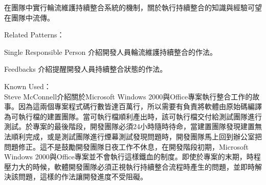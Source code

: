 \begin{description}
\begin{description}
\item 在團隊中實行輪流維護持續整合系統的機制，關於執行持續整合的知識與經驗可望在團隊中流傳。
\end{description} 
\item Related Patterns：
\begin{description}
\item Single Responsible Person 介紹開發人員輪流維護持續整合的作法。
\item Feedbacks 介紹提醒開發人員持續整合狀態的作法。
\end{description}
\item Known Used：\\
Steve McConnell介紹關於Microsoft Windows 2000與Office專案執行整合工作的故事\cite{codecomplete}。因為這兩個專案程式碼行數皆達百萬行，所以需要有負責將軟體由原始碼編譯為可執行檔的建置團隊。當可執行檔順利產出時，該可執行檔交付給測試團隊進行測試。於專案的最後階段，開發團隊必須24小時隨時待命，當建置團隊發現建置無法順利完成，或是測試團隊進行煙幕測試發現問題時，開發團隊馬上回到辦公室把問題修正。這不是鼓勵開發團隊日夜工作不休息，在開發階段初期，Microsoft Windows 2000與Office專案並不會執行這樣鐵血的制度。即使於專案的末期，時程壓力大的時候，軟體開發團隊必須正視執行持續整合流程時產生的問題，並即時解決該問題，這樣的作法讓開發進度不受阻礙。
\end{description}

